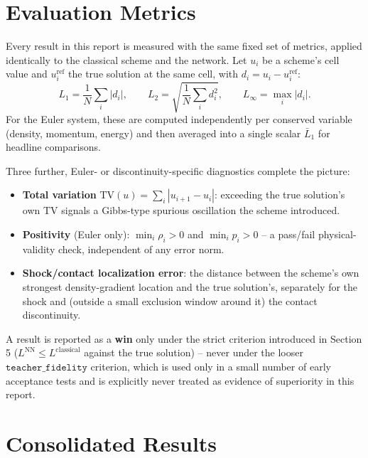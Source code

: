 \documentclass[11pt]{article}
\begin{document}
\section{Evaluation Metrics}
\label{sec:metrics}

Every result in this report is measured with the same fixed set of
metrics, applied identically to the classical scheme and the network.
Let $u_i$ be a scheme's cell value and $u_i^{\text{ref}}$ the true solution
at the same cell, with $d_i = u_i - u_i^{\text{ref}}$:
\[
L_1 = \frac{1}{N}\sum_i |d_i|, \qquad
L_2 = \sqrt{\frac{1}{N}\sum_i d_i^2}, \qquad
L_\infty = \max_i |d_i|.
\]
For the Euler system, these are computed independently per conserved
variable (density, momentum, energy) and then averaged into a single
scalar $\bar L_1$ for headline comparisons.

Three further, Euler- or discontinuity-specific diagnostics complete the
picture:

\begin{itemize}
    \item \textbf{Total variation} $\mathrm{TV}(u)=\sum_i|u_{i+1}-u_i|$:
    exceeding the true solution's own TV signals a Gibbs-type spurious
    oscillation the scheme introduced.
    \item \textbf{Positivity} (Euler only): $\min_i \rho_i > 0$ and
    $\min_i p_i > 0$ -- a pass/fail physical-validity check, independent of
    any error norm.
    \item \textbf{Shock/contact localization error}: the distance between
    the scheme's own strongest density-gradient location and the true
    solution's, separately for the shock and (outside a small exclusion
    window around it) the contact discontinuity.
\end{itemize}

A result is reported as a \textbf{win} only under the strict criterion
introduced in Section 5 ($L^{\text{NN}} \le L^{\text{classical}}$ against
the true solution) -- never under the looser $\texttt{teacher\_fidelity}$
criterion, which is used only in a small number of early acceptance tests
and is explicitly never treated as evidence of superiority in this report.

\section{Consolidated Results}
\label{sec:consolidated}
\end{document}
